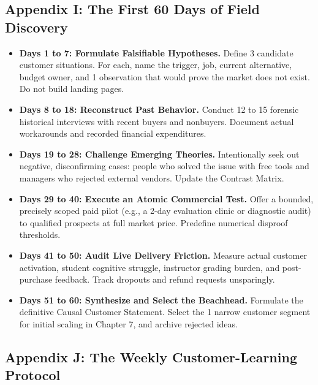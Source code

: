 \subsection*{Appendix I: The First 60 Days of Field Discovery}

\begin{itemize}[leftmargin=1.2em,itemsep=0.3ex]
  \item \textbf{Days 1 to 7: Formulate Falsifiable Hypotheses.} Define 3 candidate customer situations. For each, name the trigger, job, current alternative, budget owner, and 1 observation that would prove the market does not exist. Do not build landing pages.
  \item \textbf{Days 8 to 18: Reconstruct Past Behavior.} Conduct 12 to 15 forensic historical interviews with recent buyers and nonbuyers. Document actual workarounds and recorded financial expenditures.
  \item \textbf{Days 19 to 28: Challenge Emerging Theories.} Intentionally seek out negative, disconfirming cases: people who solved the issue with free tools and managers who rejected external vendors. Update the Contrast Matrix.
  \item \textbf{Days 29 to 40: Execute an Atomic Commercial Test.} Offer a bounded, precisely scoped paid pilot (e.g., a 2-day evaluation clinic or diagnostic audit) to qualified prospects at full market price. Predefine numerical disproof thresholds.
  \item \textbf{Days 41 to 50: Audit Live Delivery Friction.} Measure actual customer activation, student cognitive struggle, instructor grading burden, and post-purchase feedback. Track dropouts and refund requests unsparingly.
  \item \textbf{Days 51 to 60: Synthesize and Select the Beachhead.} Formulate the definitive Causal Customer Statement. Select the 1 narrow customer segment for initial scaling in Chapter 7, and archive rejected ideas.
\end{itemize}

\subsection*{Appendix J: The Weekly Customer-Learning Protocol}

